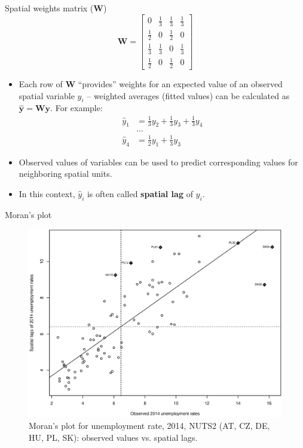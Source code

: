 \documentclass{beamer}
\begin{document}
\begin{frame}{Spatial weights matrix ($\bm{W}$)}
\vspace{-0.2cm}
$$
\bm{W}=
\begin{bmatrix}
0 & \tfrac{1}{3} & \tfrac{1}{3} & \tfrac{1}{3} \\[2pt]
\tfrac{1}{2} & 0 & \tfrac{1}{2} & 0 \\[2pt]
\tfrac{1}{3} & \tfrac{1}{3} & 0 & \tfrac{1}{3} \\[2pt]
\tfrac{1}{2} & 0 & \tfrac{1}{2} & 0
\end{bmatrix}
$$
\begin{itemize}
	\item Each row of $\bm{W}$ ``provides'' weights for an expected value of an observed spatial variable $y_i$ -- weighted averages (fitted values) can be calculated as $\hat{\bm{y}} = \bm{W \! y}$. For example:
	\begin{align*}
	\hat{y}_1 & =  \tfrac{1}{3} y_2 + \tfrac{1}{3} y_3 + \tfrac{1}{3} y_4 \\
	&\dots \\
	\hat{y}_4 & = \tfrac{1}{2} y_1  + \tfrac{1}{3} y_3 
	\end{align*}
	\item Observed values of variables can be used to predict corresponding values for neighboring spatial units.
	\smallskip
	\item In this context, $\hat{y}_i$ is often called \textbf{spatial lag} of $y_i$.
\end{itemize}
\end{frame}
\begin{frame}{Moran's plot}
\vspace{-0.3cm}
\begin{figure}
	\includegraphics[width=.7\textwidth]{IMG/sp_MoranPlot.eps}
	\caption[]{Moran's plot for unemployment rate, 2014, NUTS2 (AT, CZ, DE, HU, PL, SK): observed values vs. spatial lags.}
\end{figure}
\end{frame}
\end{document}
